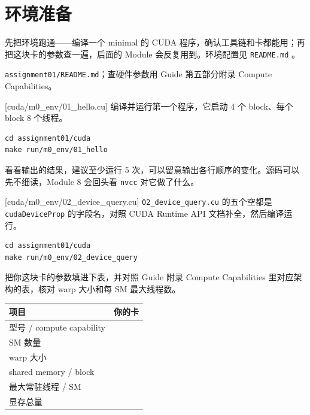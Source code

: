 \documentclass[11pt,a4paper,fontset=none]{ctexart}
\begin{document}
\setcounter{section}{-1}

\section{环境准备}

先把环境跑通——编译一个 minimal 的 CUDA 程序，确认工具链和卡都能用；再把这块卡的参数查一遍，后面的 Module 会反复用到。环境配置见 \texttt{README.md} 。

\begin{reading}
\texttt{assignment01/README.md}；查硬件参数用 Guide 第五部分附录 Compute Capabilities。
\end{reading}

[cuda/m0\_env/01\_hello.cu]
编译并运行第一个程序，它启动 4 个 block、每个 block 8 个线程。

\begin{lstlisting}
cd assignment01/cuda
make run/m0_env/01_hello
\end{lstlisting}

看看输出的结果，建议至少运行 5 次，可以留意输出各行顺序的变化。源码可以先不细读，Module 8 会回头看 \texttt{nvcc} 对它做了什么。

[cuda/m0\_env/02\_device\_query.cu]
\texttt{02\_device\_query.cu} 的五个空都是 \texttt{cudaDeviceProp} 的字段名，对照 CUDA Runtime API 文档补全，然后编译运行。

\begin{lstlisting}
cd assignment01/cuda
make run/m0_env/02_device_query
\end{lstlisting}

把你这块卡的参数填进下表，并对照 Guide 附录 Compute Capabilities 里对应架构的表，核对 warp 大小和每 SM 最大线程数。

\begin{center}\small
\begin{tabular}{@{}ll@{}}
\toprule
项目 & 你的卡 \\
\midrule
型号 / compute capability &  \\
SM 数量 &  \\
warp 大小 &  \\
shared memory / block &  \\
最大常驻线程 / SM &  \\
显存总量 &  \\
\bottomrule
\end{tabular}
\end{center}
\end{document}
